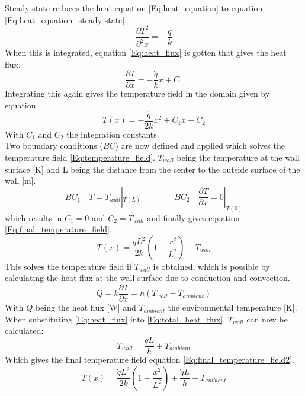 Steady state reduces the heat equation \ref{Eq:heat_equation} to equation \ref{Eq:heat_equation_steady-state}.
\begin{equation}
\label{Eq:heat_equation_steady-state}
\frac{\partial T^2}{\partial ^2 x} = -\frac{\dot{q}}{k}
\end{equation}
When this is integrated, equation \ref{Eq:heat_flux} is gotten that gives the heat flux.
\begin{equation}
\label{Eq:heat_flux}
\frac{\partial T}{\partial x} = -\frac{\dot{q}}{k}x + C_1
\end{equation}
Integrating this again gives the temperature field in the domain given by equation 
\begin{equation}
\label{Eq:temperature_field}
T(x) = - \frac{\dot{q}}{2k}x^2 + C_1 x + C_2
\end{equation}
With $C_1$ and $C_2$ the integration constants.\\
Two boundary conditions ($BC$) are now defined and applied which solves the temperature field \ref{Eq:temperature_field}. $T_{wall}$ being the temperature at the wall surface [K] and L being the distance from the center to the outside surface of the wall [m].
\begin{equation*}
BC_1 \quad T = T_{wall}|_{T(L)} \qquad\qquad BC_2 \quad \frac{\partial T}{\partial x} = 0|_{T(0)} 
\end{equation*}
which results in $C_1 = 0$ and $C_2 = T_{wall}$ and finally gives equation \ref{Eq:final_temperature_field}.
\begin{equation}
\label{Eq:final_temperature_field}
T(x) = \frac{\dot{q}L^2}{2k}(1-\frac{x^2}{L^2})+T_{wall}
\end{equation}
This solves the temperature field if $T_{wall}$ is obtained, which is possible by calculating the heat flux at the wall surface due to conduction and convection.
\begin{equation}
\label{Eq:total_heat_flux}
Q = k\frac{\partial T}{\partial x} = h(T_{wall} - T_{ambient})
\end{equation}
With $Q$ being the heat flux [W] and $T_{ambient}$ the environmental temperature [K]. When substituting \ref{Eq:heat_flux} into \ref{Eq:total_heat_flux}, $T_{wall}$ can now be calculated:
\begin{equation}
T_{wall} = \frac{\dot{q}L}{h}+T_{ambient}
\end{equation}
Which gives the final temperature field equation \ref{Eq:final_temperature_field2}.
\begin{equation}
\label{Eq:final_temperature_field2}
T(x) = \frac{\dot{q}L^2}{2k}(1-\frac{x^2}{L^2})+\frac{\dot{q}L}{h}+T_{ambient}
\end{equation}

